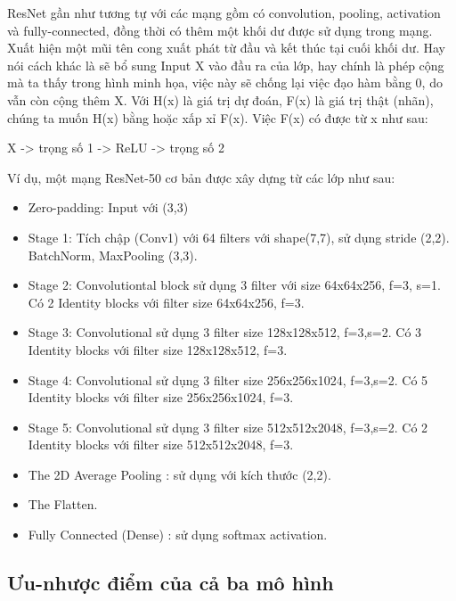 \documentclass[../main.tex]{subfiles}
\begin{document}
ResNet gần như tương tự với các mạng gồm có convolution, pooling, activation và fully-connected, đồng thời có thêm một khối dư được sử dụng trong mạng. Xuất hiện một mũi tên cong xuất phát từ đầu và kết thúc tại cuối khối dư. Hay nói cách khác là sẽ bổ sung Input X vào đầu ra của lớp, hay chính là phép cộng mà ta thấy trong hình minh họa, việc này sẽ chống lại việc đạo hàm bằng 0, do vẫn còn cộng thêm X. Với H(x) là giá trị dự đoán, F(x) là giá trị thật (nhãn), chúng ta muốn H(x) bằng hoặc xấp xỉ F(x). Việc F(x) có được từ x như sau:

\begin{center}
    X -> trọng số 1 -> ReLU -> trọng số 2
\end{center}

Ví dụ, một mạng ResNet-50 cơ bản được xây dựng từ các lớp như sau:

\begin{itemize}
    \item Zero-padding: Input với (3,3)
    \item Stage 1: Tích chập (Conv1) với 64 filters với shape(7,7), sử dụng stride (2,2). BatchNorm, MaxPooling (3,3).
    \item Stage 2: Convolutiontal block sử dụng 3 filter với size 64x64x256, f=3, s=1. Có 2 Identity blocks với filter size 64x64x256, f=3.
    \item Stage 3: Convolutional sử dụng 3 filter size 128x128x512, f=3,s=2. Có 3 Identity blocks với filter size 128x128x512, f=3.
    \item Stage 4: Convolutional sử dụng 3 filter size 256x256x1024, f=3,s=2. Có 5 Identity blocks với filter size 256x256x1024, f=3.
    \item Stage 5: Convolutional sử dụng 3 filter size 512x512x2048, f=3,s=2. Có 2 Identity blocks với filter size 512x512x2048, f=3.
    \item The 2D Average Pooling : sử dụng với kích thước (2,2).
    \item The Flatten.
    \item Fully Connected (Dense) : sử dụng softmax activation.
\end{itemize}

\subsection*{Ưu-nhược điểm của cả ba mô hình}
\end{document}
